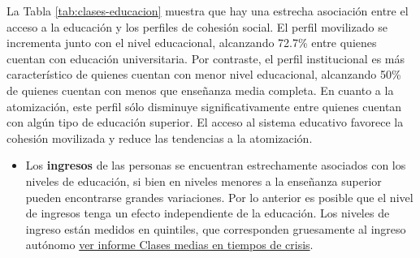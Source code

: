 \documentclass[
  12pt,
]{book}
\providecommand{\tightlist}{%
  \setlength{\itemsep}{0pt}\setlength{\parskip}{0pt}}
\begin{document}
\begin{table}

\caption{\label{tab:clases-educacion}Efecto de la educacion sobre las clases de cohesion social}
\centering
{}
\end{table}

La Tabla \ref{tab:clases-educacion} muestra que hay una estrecha asociación entre el acceso a la educación y los perfiles de cohesión social. El perfil movilizado se incrementa junto con el nivel educacional, alcanzando 72.7\% entre quienes cuentan con educación universitaria. Por contraste, el perfil institucional es más característico de quienes cuentan con menor nivel educacional, alcanzando 50\% de quienes cuentan con menos que enseñanza media completa. En cuanto a la atomización, este perfil sólo disminuye significativamente entre quienes cuentan con algún tipo de educación superior. El acceso al sistema educativo favorece la cohesión movilizada y reduce las tendencias a la atomización.

\begin{itemize}
\tightlist
\item
  Los \textbf{ingresos} de las personas se encuentran estrechamente asociados con los niveles de educación, si bien en niveles menores a la enseñanza superior pueden encontrarse grandes variaciones. Por lo anterior es posible que el nivel de ingresos tenga un efecto independiente de la educación. Los niveles de ingreso están medidos en quintiles, que corresponden gruesamente al ingreso autónomo \href{https://drive.google.com/file/d/12PsOPviSGwowOsxzvZn_vhwEoMbyMkl3/view}{ver informe Clases medias en tiempos de crisis}.
\end{itemize}
\end{document}
